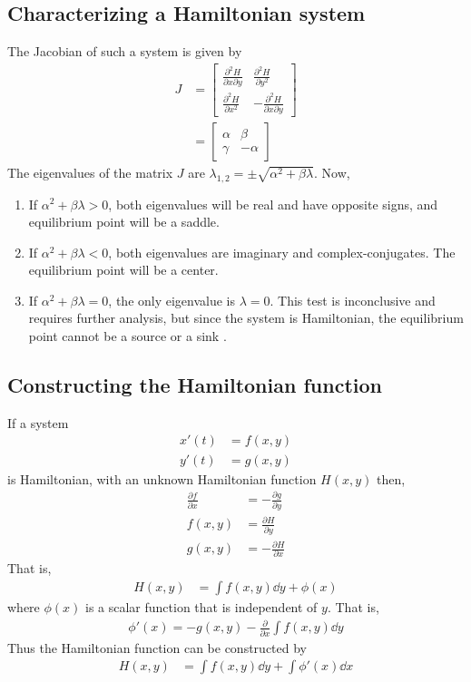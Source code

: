\documentclass[12pt,1in]{article}
\begin{document}
\subsection{Characterizing a Hamiltonian system}
The Jacobian of such a system is given by 
\begin{align}
J &= \begin{bmatrix}
\frac{\partial^2H}{\partial x \partial y} & \frac{\partial^2H}{\partial y^2} \\
\frac{\partial^2H}{\partial x^2} & -\frac{\partial^2H}{\partial x \partial y}
\end{bmatrix} \\
&= \begin{bmatrix}
\alpha & \beta \\
\gamma & -\alpha
\end{bmatrix}
\end{align}
The eigenvalues of the matrix $J$ are $\lambda_{1,2} = \pm \sqrt{\alpha^2 + \beta\lambda}$. Now,
\begin{enumerate}
	\item If $\alpha^2 + \beta\lambda > 0$, both eigenvalues will be real and have opposite signs, and equilibrium point will be a saddle. 
	\item If $\alpha^2 + \beta\lambda < 0$, both eigenvalues are imaginary and complex-conjugates. The equilibrium  point will be a center. 
	\item If $\alpha^2 + \beta\lambda = 0$, the only eigenvalue is $\lambda = 0$. This test is inconclusive and requires further analysis, but since the system is Hamiltonian, the equilibrium point cannot be a source or a sink \cite{diff_eq}.  
\end{enumerate}
\subsection{Constructing the Hamiltonian function}
If a system 
\begin{align}
x'(t) &= f(x,y) \\
y'(t) &= g(x,y)
\end{align}
is Hamiltonian, with an unknown Hamiltonian function $H(x,y)$ then, \cite{diff_eq}
\begin{align}
\frac{\partial f}{\partial x} &= -\frac{\partial g}{\partial y}  \\
f(x,y) &= \frac{\partial H}{\partial y} \\
g(x,y) &=  - \frac{\partial H}{\partial x}
\end{align}
That is,
\begin{align}
H(x,y) &= \int f(x,y) \dd{y} + \phi(x)
\end{align}
where $\phi(x)$ is a scalar function that is independent of $y$. That is,
\begin{align}
\phi'(x) = - g ( x , y ) - \frac { \partial } { \partial x } \int f ( x , y ) \dd{y}
\end{align}
Thus the Hamiltonian function can be constructed by 
\begin{align}
H(x,y) &= \int f(x,y) \dd{y} + \int \phi'(x) \dd{x}
\end{align}
\end{document}
